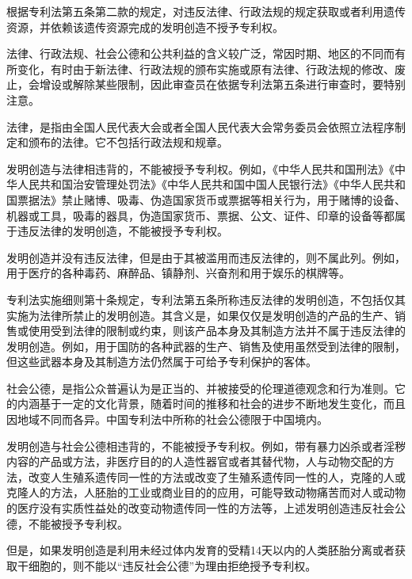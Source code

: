 根据专利法第五条第二款的规定，对违反法律、行政法规的规定获取或者利用遗传资源，并依赖该遗传资源完成的发明创造不授予专利权。

法律、行政法规、社会公德和公共利益的含义较广泛，常因时期、地区的不同而有所变化，有时由于新法律、行政法规的颁布实施或原有法律、行政法规的修改、废止，会增设或解除某些限制，因此审查员在依据专利法第五条进行审查时，要特别注意。

法律，是指由全国人民代表大会或者全国人民代表大会常务委员会依照立法程序制定和颁布的法律。它不包括行政法规和规章。

发明创造与法律相违背的，不能被授予专利权。例如，《中华人民共和国刑法》《中华人民共和国治安管理处罚法》《中华人民共和国中国人民银行法》《中华人民共和国票据法》禁止赌博、吸毒、伪造国家货币或票据等相关行为，用于赌博的设备、机器或工具，吸毒的器具，伪造国家货币、票据、公文、证件、印章的设备等都属于违反法律的发明创造，不能被授予专利权。

发明创造并没有违反法律，但是由于其被滥用而违反法律的，则不属此列。例如，用于医疗的各种毒药、麻醉品、镇静剂、兴奋剂和用于娱乐的棋牌等。

专利法实施细则第十条规定，专利法第五条所称违反法律的发明创造，不包括仅其实施为法律所禁止的发明创造。其含义是，如果仅仅是发明创造的产品的生产、销售或使用受到法律的限制或约束，则该产品本身及其制造方法并不属于违反法律的发明创造。例如，用于国防的各种武器的生产、销售及使用虽然受到法律的限制，但这些武器本身及其制造方法仍然属于可给予专利保护的客体。

社会公德，是指公众普遍认为是正当的、并被接受的伦理道德观念和行为准则。它的内涵基于一定的文化背景，随着时间的推移和社会的进步不断地发生变化，而且因地域不同而各异。中国专利法中所称的社会公德限于中国境内。

发明创造与社会公德相违背的，不能被授予专利权。例如，带有暴力凶杀或者淫秽内容的产品或方法，非医疗目的的人造性器官或者其替代物，人与动物交配的方法，改变人生殖系遗传同一性的方法或改变了生殖系遗传同一性的人，克隆的人或克隆人的方法，人胚胎的工业或商业目的的应用，可能导致动物痛苦而对人或动物的医疗没有实质性益处的改变动物遗传同一性的方法等，上述发明创造违反社会公德，不能被授予专利权。

但是，如果发明创造是利用未经过体内发育的受精14天以内的人类胚胎分离或者获取干细胞的，则不能以“违反社会公德”为理由拒绝授予专利权。

